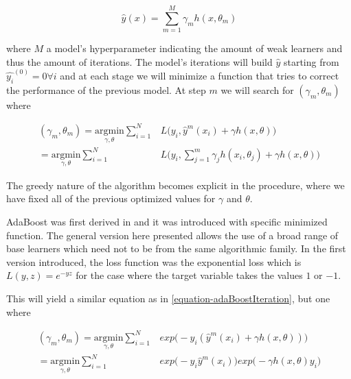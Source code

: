 \documentclass{article}%
\theoremstyle{definition}
\begin{document}
\begin{equation} \label{equation-adaBoostModel}
\hat{y}(x) = \sum_{m=1}^{M} \gamma_m h(x,\theta_m)
\end{equation}

where $M$ a model's hyperparameter indicating the amount of weak learners and thus the amount of iterations. The model's iterations will build $\hat{y}$ starting from $\hat{y_i}^{(0)}= 0 \forall i$ and at each stage we will minimize a function that tries to correct the performance of the previous model. At step $m$ we will search for $(\gamma_{m}, \theta_{m})$ where

\begin{equation} \label{equation-adaBoostIteration}
\begin{split}
(\gamma_{m}, \theta_{m}) = \underset{\gamma, \theta}{\mathrm{argmin}}  \sum_{i=1}^{N} & L\big( y_i,   \hat{y}^{m}(x_i) + \gamma h(x,\theta) \big) \\
= \underset{\gamma, \theta}{\mathrm{argmin}} \sum_{i=1}^{N}  & L\big( y_i,    \sum_{j=1}^{m} \gamma_j h(x_i,\theta_j) + \gamma h(x,\theta) \big) 
 \end{split}
\end{equation}

The greedy nature of the algorithm becomes explicit in the procedure, where we have fixed all of the previous optimized values for $\gamma$ and $\theta$. 

AdaBoost was first derived in \cite{schapire-adaBoost} and it was introduced with specific  minimized function. The general version here presented allows the use of a broad range of base learners which need not to be from the same algorithmic family. In the first version introduced, the loss function was the exponential loss which is $L(y,z) = e^{-yz}$ for the case where the target variable takes the values $1$ or $-1$.

This will yield a similar equation as in \ref{equation-adaBoostIteration}, but one where

\begin{equation} \label{equation-adaBoostExponentialIteration}
\begin{split}
(\gamma_{m}, \theta_{m}) = \underset{\gamma, \theta}{\mathrm{argmin}}  \sum_{i=1}^{N} & exp\big( -y_i  (\hat{y}^{m}(x_i) + \gamma h(x,\theta) )\big) \\
= \underset{\gamma, \theta}{\mathrm{argmin}}  \sum_{i=1}^{N} & exp\big( -y_i  \hat{y}^{m}(x_i)\big) exp\big(- \gamma h(x,\theta)y_i \big) 
\end{split}
\end{equation}
\end{document}
